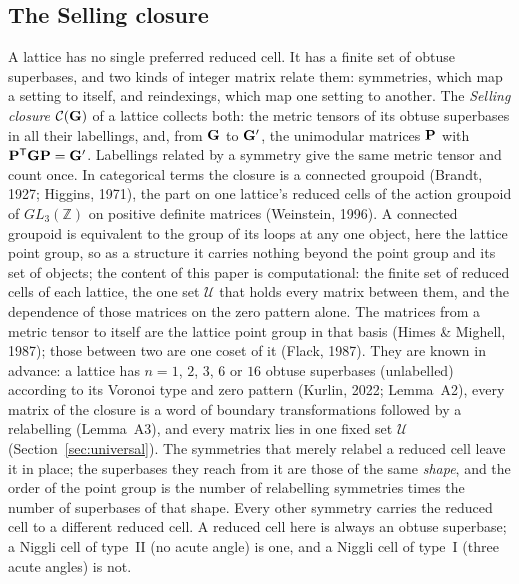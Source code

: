 \subsection{The Selling closure}
\label{sec:groupoid-def}
A lattice has no single preferred reduced cell. It has a finite set of obtuse superbases, and two kinds of integer matrix relate them: symmetries, which map a setting to itself, and reindexings, which map one setting to another. The \emph{Selling closure} $\Cl(\Gmet)$ of a lattice collects both: the metric tensors of its obtuse superbases in all their labellings, and, from $\Gmet$ to $\Gmet'$, the unimodular matrices $\Pop$ with $\Pop^{\mathsf T}\Gmet\Pop=\Gmet'$. Labellings related by a symmetry give the same metric tensor and count once. In categorical terms the closure is a connected groupoid (Brandt, 1927; Higgins, 1971), the part on one lattice's reduced cells of the action groupoid of $GL_3(\mathbb Z)$ on positive definite matrices (Weinstein, 1996). A connected groupoid is equivalent to the group of its loops at any one object, here the lattice point group, so as a structure it carries nothing beyond the point group and its set of objects; the content of this paper is computational: the finite set of reduced cells of each lattice, the one set $\mathcal U$ that holds every matrix between them, and the dependence of those matrices on the zero pattern alone. The matrices from a metric tensor to itself are the lattice point group in that basis (Himes \& Mighell, 1987); those between two are one coset of it (Flack, 1987). They are known in advance: a lattice has $n=1$, $2$, $3$, $6$ or $16$ obtuse superbases (unlabelled) according to its Voronoi type and zero pattern (Kurlin, 2022; Lemma~A2), every matrix of the closure is a word of boundary transformations followed by a relabelling (Lemma~A3), and every matrix lies in one fixed set $\mathcal U$ (Section~\ref{sec:universal}). The symmetries that merely relabel a reduced cell leave it in place; the superbases they reach from it are those of the same \emph{shape}, and the order of the point group is the number of relabelling symmetries times the number of superbases of that shape. Every other symmetry carries the reduced cell to a different reduced cell. A reduced cell here is always an obtuse superbase; a Niggli cell of type~II (no acute angle) is one, and a Niggli cell of type~I (three acute angles) is not.

